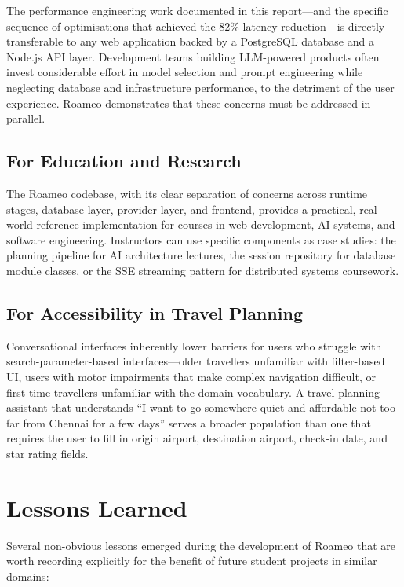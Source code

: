 \documentclass[12pt,a4paper]{report}
\begin{document}
The performance engineering work documented in this report---and the specific sequence of optimisations that achieved the 82\% latency reduction---is directly transferable to any web application backed by a PostgreSQL database and a Node.js API layer. Development teams building LLM-powered products often invest considerable effort in model selection and prompt engineering while neglecting database and infrastructure performance, to the detriment of the user experience. Roameo demonstrates that these concerns must be addressed in parallel.

\subsection{For Education and Research}

The Roameo codebase, with its clear separation of concerns across runtime stages, database layer, provider layer, and frontend, provides a practical, real-world reference implementation for courses in web development, AI systems, and software engineering. Instructors can use specific components as case studies: the planning pipeline for AI architecture lectures, the session repository for database module classes, or the SSE streaming pattern for distributed systems coursework.

\subsection{For Accessibility in Travel Planning}

Conversational interfaces inherently lower barriers for users who struggle with search-parameter-based interfaces---older travellers unfamiliar with filter-based UI, users with motor impairments that make complex navigation difficult, or first-time travellers unfamiliar with the domain vocabulary. A travel planning assistant that understands ``I want to go somewhere quiet and affordable not too far from Chennai for a few days'' serves a broader population than one that requires the user to fill in origin airport, destination airport, check-in date, and star rating fields.

\section{Lessons Learned}

Several non-obvious lessons emerged during the development of Roameo that are worth recording explicitly for the benefit of future student projects in similar domains:
\end{document}
